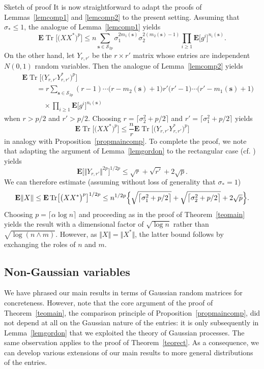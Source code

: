 \documentclass[aop,MSNbibl,dvips]{arximspdf}
\newcommand{\rrVert}{\Vert}
\newcommand{\llVert}{\Vert}
\newcommand{\EE}{\mathbf{E}}
\newcommand{\Tr}{\operatorname{Tr}}
\begin{document}
\begin{pf*}{Sketch of proof}
It is now straightforward to adapt the proofs of Lemmas~\ref{lemcomp1}
and \ref{lemcomp2} to the present setting. Assuming that $\sigma
_*\le
1$, the analogue of Lemma~\ref{lemcomp1} yields
%
\[
\EE\Tr\bigl[\bigl(XX^*\bigr)^{p}\bigr] \le n \sum
_{\mathbf{s}\in\mathcal{S}_{2p}} \sigma_1^{2m_1(\mathbf{s})}
\sigma_2^{2(m_2(\mathbf{s})-1)} \prod_{i\ge1}\EE
\bigl[g^{i}\bigr]^{n_i(\mathbf{s})}.
\]
%
On the other hand, let $Y_{r,r'}$ be the $r\times r'$ matrix whose entries
are independent $N(0,1)$ random variables.
Then the analogue of Lemma~\ref{lemcomp2} yields
%
\begin{eqnarray*}
&&\EE\Tr\bigl[\bigl(Y_{r,r'}Y_{r,r'}^*\bigr)^{p}
\bigr]
\\
&&\qquad =
r\sum_{\mathbf{s}\in\mathcal{S}_{2p}} (r-1)\cdots\bigl(r-m_2(
\mathbf{s})+1\bigr) r'\bigl(r'-1\bigr)\cdots
\bigl(r'-m_1(\mathbf{s})+1\bigr)
\\
&&\quad\qquad{}\times \prod
_{i\ge1}\EE\bigl[g^{i}\bigr]^{n_i(\mathbf{s})}
\end{eqnarray*}
%
when $r>p/2$ and $r'>p/2$. Choosing $r=\lceil\sigma_2^2+p/2\rceil$
and $r'=\lceil\sigma_1^2+p/2\rceil$ yields
%
\[
\EE\Tr\bigl[\bigl(XX^*\bigr)^{p}\bigr] \le\frac{n}{r}\EE\Tr
\bigl[\bigl(Y_{r,r'}Y_{r,r'}^*\bigr)^{p}\bigr]
%
\]
%
in analogy with Proposition~\ref{propmaincomp}.
To complete the proof, we note that adapting the argument of
Lemma~\ref{lemgordon} to the rectangular case (cf. \cite{DS01}) yields
%
\[
\EE\bigl[\llVert Y_{r,r'}\rrVert^{2p}\bigr]^{1/2p}
\le\sqrt{r} + \sqrt{r'} + 2\sqrt{p}. %
\]
%
We can therefore estimate (assuming without loss of generality
that $\sigma_*=1$)
%
\[
\EE\llVert X\rrVert\le\EE\Tr\bigl[\bigl(XX^*\bigr)^{p}
\bigr]^{1/2p} \le n^{1/2p}\Bigl\{{\textstyle\sqrt{\bigl
\lceil\sigma_1^2+p/2\bigr\rceil} +\sqrt{\bigl
\lceil\sigma_2^2+p/2\bigr\rceil}}+2\sqrt{p}\Bigr\}.
%
\]
%
Choosing $p=\lceil\alpha\log n\rceil$ and proceeding as in the proof of
Theorem~\ref{teomain} yields the result with a dimensional factor of
$\sqrt{\log n}$ rather than $\sqrt{\log(n\wedge m)}$. However, as
$\llVert X\rrVert =\llVert X^*\rrVert $, the latter bound follows
by exchanging the roles of $n$
and $m$.
\end{pf*}

\subsection{Non-Gaussian variables}\label{secnong}

We have phrased our main results in terms of Gaussian random matrices for
concreteness. However, note that the core argument of the proof of
Theorem~\ref{teomain}, the comparison principle of
Proposition~\ref{propmaincomp}, did not depend at all on the Gaussian
nature of the
entries: it is only subsequently in Lemma~\ref{lemgordon} that we
exploited the theory of Gaussian processes. The same observation applies
to the proof of Theorem~\ref{teorect}. As a consequence, we can
develop various extensions of our main results to more general
distributions of the entries.
\end{document}
